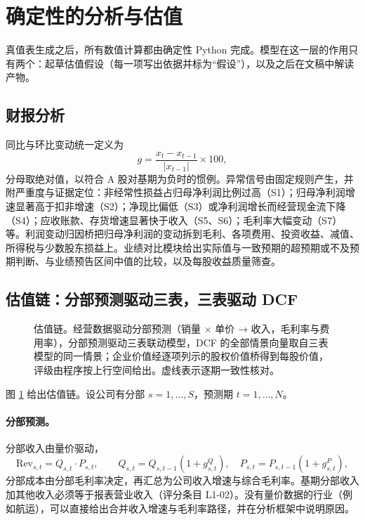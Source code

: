 \section{确定性的分析与估值}
\label{sec:valuation}

真值表生成之后，所有数值计算都由确定性 Python 完成。模型在这一层的作用只有两个：起草估值假设（每一项写出依据并标为“假设”），以及之后在文稿中解读产物。

\subsection{财报分析}
同比与环比变动统一定义为
\begin{equation}
  g = \frac{x_t - x_{t-1}}{|x_{t-1}|}\times 100,
\end{equation}
分母取绝对值，以符合 A 股对基期为负时的惯例。异常信号由固定规则产生，并附严重度与证据定位：非经常性损益占归母净利润比例过高（S1）；归母净利润增速显著高于扣非增速（S2）；净现比偏低（S3）或净利润增长而经营现金流下降（S4）；应收账款、存货增速显著快于收入（S5、S6）；毛利率大幅变动（S7）等。利润变动归因桥把归母净利润的变动拆到毛利、各项费用、投资收益、减值、所得税与少数股东损益上。业绩对比模块给出实际值与一致预期的超预期或不及预期判断、与业绩预告区间中值的比较，以及每股收益质量筛查。

\subsection{估值链：分部预测驱动三表，三表驱动 DCF}
\label{sec:val-chain}

\begin{figure}[t]
  \centering
  \caption{估值链。经营数据驱动分部预测（销量 × 单价 → 收入，毛利率与费用率），分部预测驱动三表联动模型，DCF 的全部情景向量取自三表模型的同一情景；企业价值经逐项列示的股权价值桥得到每股价值，评级由程序按上行空间给出。虚线表示逐期一致性核对。}
  \label{fig:valuation}
\end{figure}

图 \ref{fig:valuation} 给出估值链。设公司有分部 $s=1,\dots,S$，预测期 $t=1,\dots,N$。

\paragraph{分部预测。}分部收入由量价驱动，
\begin{equation}
  \mathrm{Rev}_{s,t} = Q_{s,t}\cdot P_{s,t},\qquad Q_{s,t}=Q_{s,t-1}(1+g^{Q}_{s,t}),\quad P_{s,t}=P_{s,t-1}(1+g^{P}_{s,t}),
\end{equation}
分部成本由分部毛利率决定，再汇总为公司收入增速与综合毛利率。基期分部收入加其他收入必须等于报表营业收入（评分条目 L1-02）。没有量价数据的行业（例如航运），可以直接给出合并收入增速与毛利率路径，并在分析框架中说明原因。

